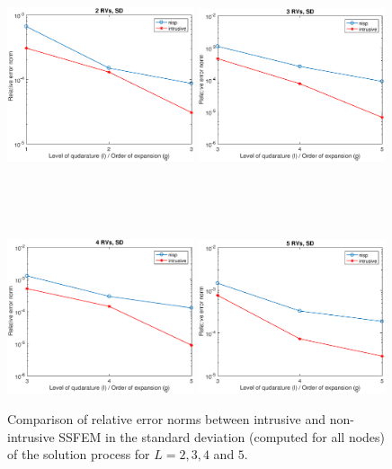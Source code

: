 \documentclass[letter,1p,11pt,oneside,onecolumn,sort&compress]{elsarticle}
\begin{document}
\begin{figure}[htbp]
\centering
 \includegraphics[width=0.49\textwidth,height=0.3\textheight]{plots/sigma04_2RN_sd.eps}
 \includegraphics[width=0.49\textwidth,height=0.3\textheight]{plots/sigma04_3RN_sd.eps}

\

\

 \includegraphics[width=0.49\textwidth,height=0.3\textheight]{plots/sigma04_4RN_sd.eps}
 \includegraphics[width=0.49\textwidth,height=0.3\textheight]{plots/sigma04_5RN_sd.eps}
 \caption{Comparison of relative error norms between intrusive and non-intrusive SSFEM in the standard deviation (computed for all nodes) of the solution process for $L=2,3,4$ and $5$.}
 \label{fig:SD}
\end{figure}
\end{document}
